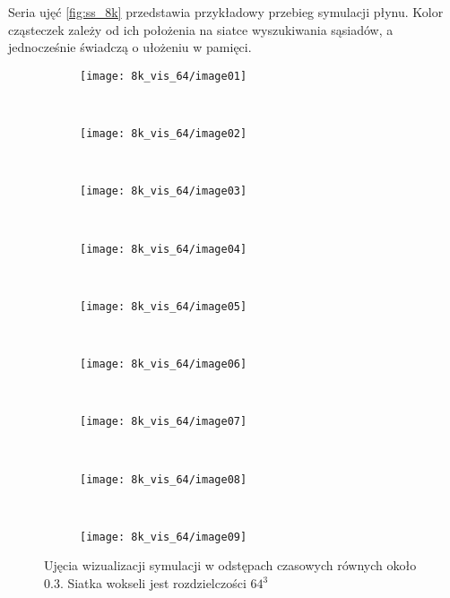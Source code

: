 \par
Seria ujęć \eqref{fig:ss_8k} przedstawia przykładowy przebieg symulacji płynu. Kolor cząsteczek zależy od ich położenia na siatce wyszukiwania sąsiadów, a jednocześnie świadczą o ułożeniu w pamięci.

\begin{figure}[H]
\centering     %

\begin{subfigure}[b]{0.3\textwidth}
\texttt{[image: 8k\_vis\_64/image01]}%
\end{subfigure}
~
\begin{subfigure}[b]{0.3\textwidth}
\texttt{[image: 8k\_vis\_64/image02]}%
\end{subfigure}
~
\begin{subfigure}[b]{0.3\textwidth}
\texttt{[image: 8k\_vis\_64/image03]}%
\end{subfigure}
\\
\vspace{1em}
\begin{subfigure}[b]{0.3\textwidth}
\texttt{[image: 8k\_vis\_64/image04]}%
\end{subfigure}
~
\begin{subfigure}[b]{0.3\textwidth}
\texttt{[image: 8k\_vis\_64/image05]}%
\end{subfigure}
~
\begin{subfigure}[b]{0.3\textwidth}
\texttt{[image: 8k\_vis\_64/image06]}%
\end{subfigure}
\\
\vspace{1em}
\begin{subfigure}[b]{0.3\textwidth}
\texttt{[image: 8k\_vis\_64/image07]}%
\end{subfigure}
~
\begin{subfigure}[b]{0.3\textwidth}
\texttt{[image: 8k\_vis\_64/image08]}%
\end{subfigure}
~
\begin{subfigure}[b]{0.3\textwidth}
\texttt{[image: 8k\_vis\_64/image09]}%
\end{subfigure}

\caption{Ujęcia wizualizacji symulacji w odstępach czasowych równych około 0.3. Siatka wokseli jest rozdzielczości $64^3$}
\label{fig:ss_8k_vis_64}
\end{figure}

